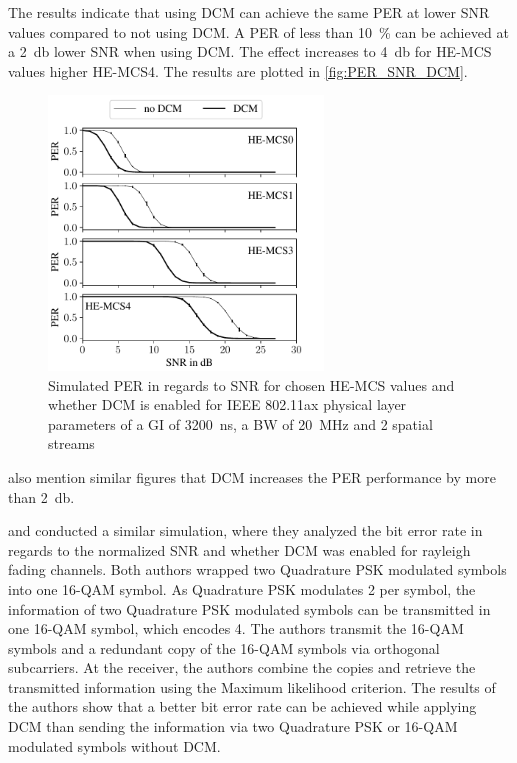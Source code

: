 The results indicate that using \ac{DCM} can achieve the same \ac{PER} at lower \ac{SNR} values compared to not using \ac{DCM}. A \ac{PER} of less than \SI{10}{\percent} can be achieved at
a \SI{2}{\decibel} lower \ac{SNR} when using \ac{DCM}.
The effect increases to \SI{4}{\decibel} for \ac{HE}-\ac{MCS} values higher \ac{HE}-\ac{MCS}\num{4}.
The results are plotted in \autoref{fig:PER_SNR_DCM}.
\begin{figure}[H]%
   \centering
   \includegraphics[width=0.65\textwidth]{figures/DCM_PER_to_SNR.pdf}
   \caption{Simulated \ac{PER} in regards to \ac{SNR} for chosen \ac{HE}-\ac{MCS} values and whether \ac{DCM} is enabled for IEEE 802.11ax physical layer parameters of a \ac{GI} of \SI{3200}{\nano\second}, a \ac{BW} of \SI{20}{\mega\hertz} and 2 spatial streams}%
   \label{fig:PER_SNR_DCM}%
\end{figure}

\textcite{khorov_ieee_2015} also mention similar figures that \ac{DCM} increases the \ac{PER} performance by more than \SI{2}{\decibel}.

\textcite{ryu_ber_2010} and \textcite{park_ber_2006} conducted a similar simulation, where they analyzed the bit error rate in
regards to the normalized \ac{SNR} and whether \ac{DCM} was enabled for rayleigh fading channels.
Both authors wrapped two Quadrature \ac{PSK} modulated symbols into one 16-\ac{QAM} symbol.
As Quadrature \ac{PSK} modulates \SI{2}{\bit} per symbol, the information of two Quadrature \ac{PSK} modulated symbols can be
transmitted in one 16-\ac{QAM} symbol, which encodes \SI{4}{\bit}.
The authors transmit the 16-\ac{QAM} symbols and a redundant copy
of the 16-\ac{QAM} symbols via orthogonal subcarriers.
At the receiver, the authors combine the copies and retrieve the transmitted
information using the Maximum likelihood criterion.
The results of the authors show that a better bit error rate can be achieved while applying
\ac{DCM} than sending the information via two Quadrature \ac{PSK} or 16-\ac{QAM} modulated symbols without \ac{DCM}.



